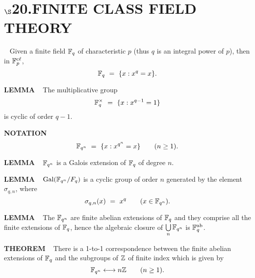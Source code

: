 \chapter{
$\boldsymbol{\S}$\textbf{20}.\quad  FINITE CLASS FIELD THEORY}
\setlength\parindent{2em}
\setcounter{theoremn}{0}

\ \indent 
Given a finite field $\mathbb{F}_q$ of characteristic $p$ (thus $q$ is an integral power of $p$), then in $\mathbb{F}_p^{\text{c$\ell$}}$,
\[
\mathbb{F}_q \ = \ \{x:x^q = x\}.
\]
\vspace{0.1cm}

\begin{x}{\small\bf LEMMA} \ %
The multiplicative group 
\[
\mathbb{F}_q^\times \ = \ \{x:x^{q-1} = 1\}
\]
is cyclic of order $q-1$.
\end{x}
\vspace{0.1cm}

\begin{x}{\small\bf NOTATION} \ %
\[
\mathbb{F}_{q^n} \ = \ \{x:x^{q^n} = x\} \qquad (n \geq 1).
\]
\end{x}
\vspace{0.1cm}

\begin{x}{\small\bf LEMMA} \ %
$\mathbb{F}_{q^n}$ is a Galois extension of $\mathbb{F}_q$ of degree $n$.
\end{x}
\vspace{0.1cm}

\begin{x}{\small\bf LEMMA} \ %
$\text{Gal}(\mathbb{F}_{q^n}/F_q)$ is a cyclic group of order $n$ generated by the element $\sigma_{q,n}$, where
\[
\sigma_{q,n}(x) \ = \ x^q \qquad (x \in \mathbb{F}_{q^n}).
\]
\end{x}
\vspace{0.1cm}

\begin{x}{\small\bf LEMMA} \ %
The $\mathbb{F}_{q^n}$ are finite abelian extensions of $\mathbb{F}_q$ and they comprise all the finite extensions of $\mathbb{F}_q$, hence the algebraic closure of $\bigcup\limits_n \mathbb{F}_{q^n}$ is $\mathbb{F}_q^{\text{ab}}$.
\end{x}
\vspace{0.1cm}

\begin{x}{\small\bf THEOREM} \ %
There is a 1-to-1 correspondence between the finite abelian 
extensions of $\mathbb{F}_q$ and the subgroups of $\mathbb{Z}$ of finite index which is given by 
\[
\mathbb{F}_{q^n} \longleftrightarrow n\mathbb{Z} \qquad (n \geq 1).
\]
\end{x}
\vspace{0.1cm}

